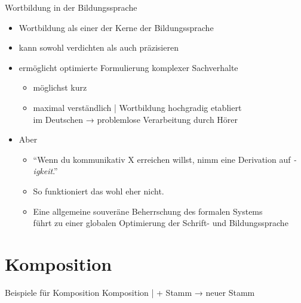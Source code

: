 \begin{frame}
  {Wortbildung in der Bildungssprache}
  \pause
  \begin{itemize}[<+->]
    \item Wortbildung als einer der Kerne der Bildungssprache
    \item kann sowohl \alert{verdichten} als auch \alert{präzisieren}
    \Halbzeile
    \item ermöglicht \alert{optimierte} Formulierung komplexer Sachverhalte 
      \begin{itemize}[<+->]
        \item möglichst kurz
        \item maximal verständlich | Wortbildung hochgradig etabliert\\
          im Deutschen → problemlose Verarbeitung durch Hörer
      \end{itemize}
      \Halbzeile
    \item Aber 
      \Halbzeile
      \begin{itemize}[<+->]
        \item "`Wenn du kommunikativ X erreichen willst, nimm eine Derivation auf \textit{-igkeit}."'
        \item So funktioniert das wohl eher nicht.
        \item Eine allgemeine souveräne \alert{Beherrschung des formalen Systems}\\
          führt zu einer globalen \alert{Optimierung der Schrift- und Bildungssprache}
      \end{itemize}
  \end{itemize}
\end{frame}


\section{Komposition}

\begin{frame}
  {Beispiele für Komposition}
  \onslide<+->
  Komposition |  + \alert{Stamm} → neuer Stamm
  \Halbzeile
  \onslide<+->
  \begin{exe}
    \ex
    \begin{xlist}
      \onslide<+->
      \onslide<+->
      \onslide<+->
      \onslide<+->
      \onslide<+->
      \onslide<+->
      \onslide<+->
      \onslide<+->
    \end{xlist}
  \end{exe}
\end{frame}


